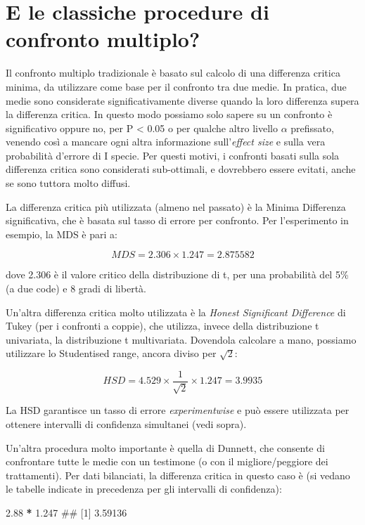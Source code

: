 \documentclass[a4paper,12pt,oneside]{book}
\newenvironment{Shaded}{\begin{snugshade}}{\end{snugshade}}
\newcommand{\FloatTok}[1]{\textcolor[rgb]{0.00,0.00,0.81}{#1}}
\newcommand{\StringTok}[1]{\textcolor[rgb]{0.31,0.60,0.02}{#1}}
\newcommand{\OperatorTok}[1]{\textcolor[rgb]{0.81,0.36,0.00}{\textbf{#1}}}
\newcommand{\NormalTok}[1]{#1}
\theoremstyle{definition}
\theoremstyle{definition}
\theoremstyle{definition}
\theoremstyle{remark}
\begin{document}
\section{E le classiche procedure di confronto
multiplo?}\label{e-le-classiche-procedure-di-confronto-multiplo}

Il confronto multiplo tradizionale è basato sul calcolo di una
differenza critica minima, da utilizzare come base per il confronto tra
due medie. In pratica, due medie sono considerate significativamente
diverse quando la loro differenza supera la differenza critica. In
questo modo possiamo solo sapere su un confronto è significativo oppure
no, per P \textless{} 0.05 o per qualche altro livello \(\alpha\)
prefissato, venendo così a mancare ogni altra informazione
sull'\emph{effect size} e sulla vera probabilità d'errore di I specie.
Per questi motivi, i confronti basati sulla sola differenza critica sono
considerati sub-ottimali, e dovrebbero essere evitati, anche se sono
tuttora molto diffusi.

La differenza critica più utilizzata (almeno nel passato) è la Minima
Differenza significativa, che è basata sul tasso di errore per
confronto. Per l'esperimento in esempio, la MDS è pari a:

\[ MDS = 2.306 \times 1.247 = 2.875582\]

dove 2.306 è il valore critico della distribuzione di t, per una
probabilità del 5\% (a due code) e 8 gradi di libertà.

Un'altra differenza critica molto utilizzata è la \emph{Honest
Significant Difference} di Tukey (per i confronti a coppie), che
utilizza, invece della distribuzione t univariata, la distribuzione t
multivariata. Dovendola calcolare a mano, possiamo utilizzare lo
Studentised range, ancora diviso per \(\sqrt{2}\):

\[ HSD = 4.529 \times \frac{1}{\sqrt{2}} \times 1.247 = 3.9935 \]

La HSD garantisce un tasso di errore \emph{experimentwise} e può essere
utilizzata per ottenere intervalli di confidenza simultanei (vedi
sopra).

Un'altra procedura molto importante è quella di Dunnett, che consente di
confrontare tutte le medie con un testimone (o con il migliore/peggiore
dei trattamenti). Per dati bilanciati, la differenza critica in questo
caso è (si vedano le tabelle indicate in precedenza per gli intervalli
di confidenza):

\begin{Shaded}
\begin{Highlighting}[]
\FloatTok{2.88} \OperatorTok{*}\StringTok{ }\FloatTok{1.247}
\NormalTok{## [1] 3.59136}
\end{Highlighting}
\end{Shaded}
\end{document}
